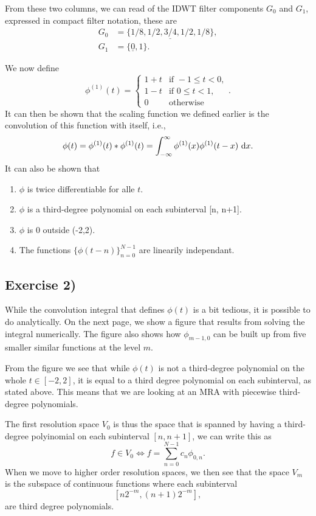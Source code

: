 \documentclass[a4paper, 11pt, notitlepage, english]{article}
\renewcommand{\d}{{\rm d}}
\begin{document}
From these two columns, we can read of the IDWT filter components $G_0$ and $G_1$, expressed in compact filter notation, these are
\begin{align*}
G_0 &= \{1/8, 1/2, \underline{3/4}, 1/2, 1/8 \}, \\
G_1 &= \{\underline{0}, 1\}.
\end{align*}


\clearpage

We now define
$$\phi^{(1)}(t) = \begin{cases}
    1+t & \mbox{if } -1 \leq t < 0, \\
    1 -t & \mbox{if } 0 \leq t < 1, \\
    0 & \mbox{otherwise}
\end{cases}.$$
It can then be shown that the scaling function we defined earlier is the convolution of this function with itself, i.e.,
$$\phi(t) = \phi^{(1)}(t)*\phi^{(1)}(t) = \int_{-\infty}^\infty \phi^{(1)}(x)\phi^{(1)}(t-x)\ \d x.$$
It can also be shown that
\begin{enumerate}
    \item $\phi$ is twice differentiable for alle $t$.
    \item $\phi$ is a third-degree polynomial on each subinterval [n, n+1].
    \item $\phi$ is 0 outside (-2,2).
    \item The functions $\{\phi(t-n)\}_{n=0}^{N-1}$ are linearily independant.
\end{enumerate}

\subsection*{Exercise 2)}
While the convolution integral that defines $\phi(t)$ is a bit tedious, it is possible to do analytically. On the next page, we show a figure that results from solving the integral numerically. The figure also shows how $\phi_{m-1,0}$ can be built up from five smaller similar functions at the level $m$.

From the figure we see that while $\phi(t)$ is not a third-degree polynomial on the whole $t\in[-2,2]$, it is equal to a third degree polynomial on each subinterval, as stated above. This means that we are looking at an MRA with piecewise third-degree polynomials.

The first resolution space $V_{0}$ is thus the space that is spanned by having a third-degree polyinomial on each subinterval $[n,n+1]$, we can write this as
$$f \in V_0 \Leftrightarrow f = \sum_{n=0}^{N-1} c_n \phi_{0,n}.$$
When we move to higher order resolution spaces, we then see that the space $V_m$ is the subspace of continuous functions where each subinterval
$$[n2^{-m},(n+1)2^{-m}],$$
are third degree polynomials.
\end{document}
